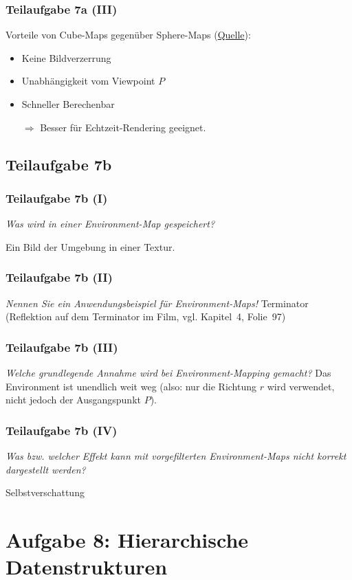 \documentclass[a4paper]{scrartcl}
\begin{document}
\subsubsection*{Teilaufgabe 7a (III)}
Vorteile von Cube-Maps gegenüber Sphere-Maps (\href{https://en.wikipedia.org/wiki/Cube_mapping}{Quelle}):
\begin{itemize}
    \item Keine Bildverzerrung
    \item Unabhängigkeit vom Viewpoint $P$
    \item Schneller Berechenbar
    \item[$\Rightarrow$] Besser für Echtzeit-Rendering geeignet.
\end{itemize}


\subsection*{Teilaufgabe 7b}
\subsubsection*{Teilaufgabe 7b (I)}
\textit{Was wird in einer Environment-Map gespeichert?}

Ein Bild der Umgebung in einer Textur.

\subsubsection*{Teilaufgabe 7b (II)}
\textit{Nennen Sie ein Anwendungsbeispiel für Environment-Maps!}
Terminator (Reflektion auf dem Terminator im Film, vgl. Kapitel~4, Folie~97)

\subsubsection*{Teilaufgabe 7b (III)}
\textit{Welche grundlegende Annahme wird bei Environment-Mapping gemacht?}
Das Environment ist unendlich weit weg (also: nur die Richtung $r$ wird verwendet,
nicht jedoch der Ausgangspunkt $P$).

\subsubsection*{Teilaufgabe 7b (IV)}
\textit{Was bzw. welcher Effekt kann mit vorgefilterten Environment-Maps nicht korrekt dargestellt werden?}

Selbstverschattung


\section*{Aufgabe 8: Hierarchische Datenstrukturen}
\end{document}
